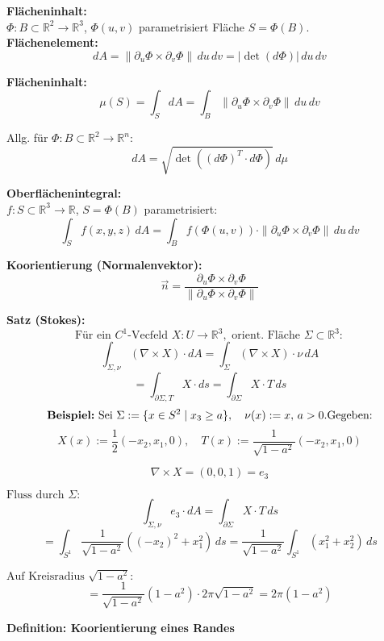 \textbf{Flächeninhalt:} \\
$\Phi : B \subset \mathbb{R}^2 \to \mathbb{R}^3$, $\Phi(u,v)$ parametrisiert Fläche $S = \Phi(B)$. \\
\textbf{Flächenelement:}
\[
dA = \|\partial_u \Phi \times \partial_v \Phi\| \, du\,dv = |\det(d\Phi)| \, du\,dv
\]

\textbf{Flächeninhalt:}
\[
\mu(S) = \int_S dA = \int_B \|\partial_u \Phi \times \partial_v \Phi\| \, du\,dv
\]

Allg. für $\Phi: B \subset \mathbb{R}^2 \to \mathbb{R}^n$:
\[
dA = \sqrt{\det((d\Phi)^T \cdot d\Phi)} \, d\mu
\]

\vspace{1em}

\textbf{Oberflächenintegral:} \\
$f : S \subset \mathbb{R}^3 \to \mathbb{R}$, $S = \Phi(B)$ parametrisiert:
\[
\int_S f(x,y,z)\, dA = \int_B f(\Phi(u,v)) \cdot \|\partial_u \Phi \times \partial_v \Phi\| \, du\,dv
\]

\vspace{1em}

\textbf{Koorientierung (Normalenvektor):}
\[
\vec{n} = \frac{\partial_u \Phi \times \partial_v \Phi}{\|\partial_u \Phi \times \partial_v \Phi\|}
\]



\textbf{Satz (Stokes):} \\
\[
\text{Für ein } C^1\text{-Vecfeld } X : U \to \mathbb{R}^3, \text{ orient. Fläche } \Sigma \subset \mathbb{R}^3: 
\]
\[
\int_{\Sigma, \nu} (\nabla \times X) \cdot dA 
= \int_{\Sigma} (\nabla \times X) \cdot \nu \, dA 
\]
\[
= \int_{\partial \Sigma, T} X \cdot ds 
= \int_{\partial \Sigma} X \cdot T \, ds
\]
\[
\textbf{Beispiel:} \text{ Sei } \Sigma := \{x \in S^2 \mid x_3 \geq a \}, \quad \nu(x) := x, \, a > 0. \\
\text{Gegeben:}
\]
\[
X(x) := \frac{1}{2}(-x_2, x_1, 0), \quad T(x) := \frac{1}{\sqrt{1 - a^2}}(-x_2, x_1, 0)
\]

\[
\nabla \times X = (0, 0, 1) = e_3
\]

$\text{Fluss durch } \Sigma: $
\[
\int_{\Sigma, \nu} e_3 \cdot dA 
= \int_{\partial \Sigma} X \cdot T \, ds 
\]
\[
= \int_{S^1} \frac{1}{\sqrt{1-a^2}} ((-x_2)^2 + x_1^2) \, ds 
= \frac{1}{\sqrt{1 - a^2}} \int_{S^1} (x_1^2 + x_2^2) \, ds
\]

$\text{Auf Kreisradius } \sqrt{1 - a^2}: $
\[
= \frac{1}{\sqrt{1 - a^2}} (1 - a^2) \cdot 2\pi\sqrt{1 - a^2}
= 2\pi (1 - a^2)
\]


\textbf{Definition: Koorientierung eines Randes}
